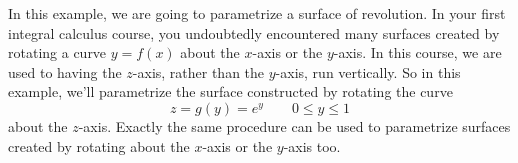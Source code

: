 \begin{eg}\label{SURrevolution}
In this example, we are going to parametrize a surface of revolution.
In your first integral calculus course, you undoubtedly encountered
many surfaces created by rotating a curve $y=f(x)$ about the $x$-axis
or the $y$-axis. 
In this course, we are used to having the $z$-axis, rather than the $y$-axis, 
run vertically. 
So in this example, we'll parametrize the surface 
constructed by rotating the curve 
\begin{equation*}
z=g(y)=e^y \qquad 0\le y\le 1
\end{equation*}
about the $z$-axis. Exactly the same procedure can be used to parametrize
surfaces created by rotating about the $x$-axis or the $y$-axis too.


\end{eg}
